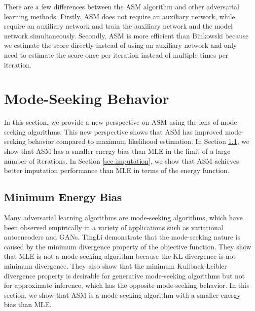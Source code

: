 \documentclass{article} %
\begin{document}
There are a few differences between the ASM algorithm and other adversarial learning methods. Firstly, ASM does not require an auxiliary network, while \citet{Li2019a} require an auxiliary network and train the auxiliary network and the model network simultaneously. Secondly, ASM is more efficient than Binkowski because we estimate the score directly instead of using an auxiliary network and only need to estimate the score once per iteration instead of multiple times per iteration.


\section{Mode-Seeking Behavior}

\label{sec:mode_seeking}
In this section, we provide a new perspective on ASM using the lens of mode-seeking algorithms. This new perspective shows that ASM has improved mode-seeking behavior compared to maximum likelihood estimation. In Section \ref{sec:energy_bias}, we show that ASM has a smaller energy bias than MLE in the limit of a large number of iterations. In Section \ref{sec:imputation}, we show that ASM achieves better imputation performance than MLE in terms of the energy function.

\subsection{Minimum Energy Bias}
\label{sec:energy_bias}
Many adversarial learning algorithms are mode-seeking algorithms, which have been observed empirically in a variety of applications such as variational autoencoders \citep{Burda2016} and GANs. TingLi demonstrate that the mode-seeking nature is caused by the minimum divergence property of the objective function. They show that MLE is not a mode-seeking algorithm because the KL divergence is not minimum divergence. They also show that the minimum Kullback-Leibler divergence property is desirable for generative mode-seeking algorithms but not for approximate inference, which has the opposite mode-seeking behavior. In this section, we show that ASM is a mode-seeking algorithm with a smaller energy bias than MLE.
\end{document}
